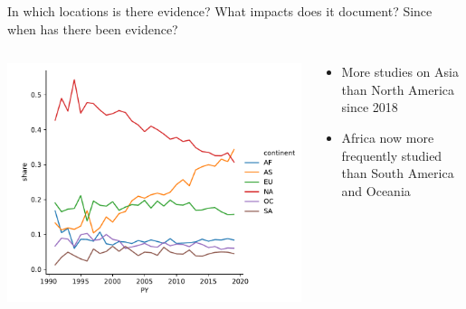\documentclass[9pt]{beamer}
\begin{document}
\begin{frame}{In which locations is there evidence? What impacts does it document? Since when has there been evidence?}
\begin{columns}
\begin{column}{0.382\linewidth}
		\includegraphics[width=\linewidth]{../plots/literature_distribution/PY_continent_shares.pdf}
	\end{column}
	\begin{column}{0.618\linewidth}
		\begin{itemize}
			\item More studies on Asia than North America since 2018
			\item Africa now more frequently studied than South America and Oceania
			
		\end{itemize}
	\end{column}
\end{columns}

\end{frame}

\end{document}

